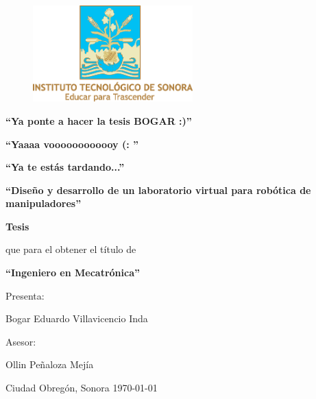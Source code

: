 \thispagestyle{empty}
\begin{figure}[!t]
\centering
\includegraphics[width=0.55\textwidth, height=0.25\textheight]{./figs/logoclr}
\end{figure}

\begin{center}

\vspace*{1cm}

{\bf \LARGE ``Ya ponte a hacer la tesis BOGAR  :)''}

\vspace*{1cm}

{\bf \LARGE ``Yaaaa voooooooooooy (:  ''}

\vspace*{1cm}

{\bf \LARGE ``Ya te estás tardando...''}

\vspace*{1cm}

{\bf \LARGE ``Diseño y desarrollo de un laboratorio virtual para robótica de manipuladores''}

\vspace*{0.75cm}

{\bf \Large Tesis }

\vspace*{0.65cm}

{\Large que para el obtener el título de}

\vspace{0.65cm}

{\bf \Large ``Ingeniero en Mecatrónica''}

\vspace{0.75cm}

\begin{framed}

{\large Presenta:}

\vspace{0.3cm}

{\large Bogar Eduardo Villavicencio Inda}

\vspace{0.3cm}

{\large Asesor:}

\vspace{0.3cm}

{\large Ollin Peñaloza Mejía}

\end{framed}

\vfill

\begin{shaded*}
{\large {\color{white}Ciudad Obregón, Sonora \hfill \today}}
\end{shaded*}

\end{center}

\pagebreak
